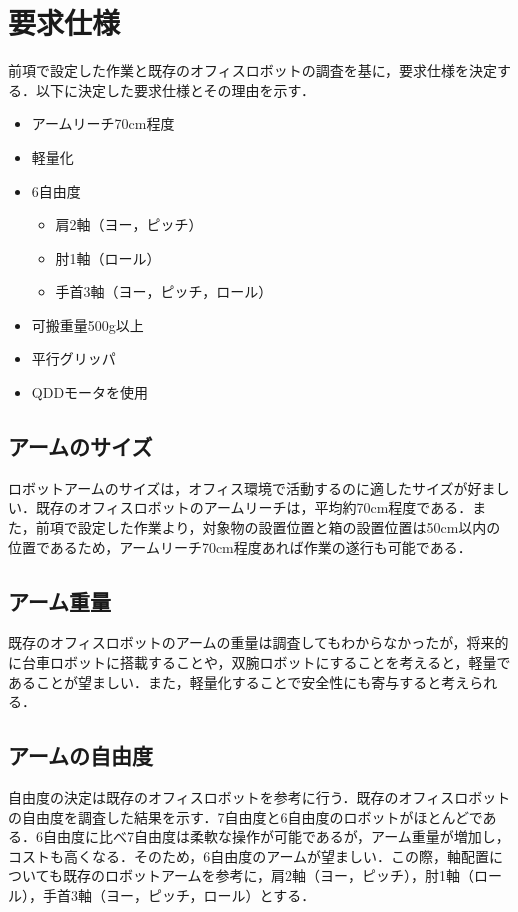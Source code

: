 \section{要求仕様}
前項で設定した作業と既存のオフィスロボットの調査を基に，要求仕様を決定する．以下に決定した要求仕様とその理由を示す．
\begin{itemize}
  \item アームリーチ70cm程度
  \item 軽量化
  \item 6自由度
  \begin{itemize}
    \item 肩2軸（ヨー，ピッチ）
    \item 肘1軸（ロール）
    \item 手首3軸（ヨー，ピッチ，ロール）
  \end{itemize}
  \item 可搬重量500g以上
  \item 平行グリッパ
  \item QDDモータを使用
\end{itemize}
\subsection{アームのサイズ}
ロボットアームのサイズは，オフィス環境で活動するのに適したサイズが好ましい．既存のオフィスロボットのアームリーチは，平均約70cm程度である．また，前項で設定した作業より，対象物の設置位置と箱の設置位置は50cm以内の位置であるため，アームリーチ70cm程度あれば作業の遂行も可能である．
\subsection{アーム重量}
既存のオフィスロボットのアームの重量は調査してもわからなかったが，将来的に台車ロボットに搭載することや，双腕ロボットにすることを考えると，軽量であることが望ましい．また，軽量化することで安全性にも寄与すると考えられる．
\subsection{アームの自由度}
自由度の決定は既存のオフィスロボットを参考に行う．既存のオフィスロボットの自由度を調査した結果を示す．7自由度と6自由度のロボットがほとんどである．6自由度に比べ7自由度は柔軟な操作が可能であるが，アーム重量が増加し，コストも高くなる．そのため，6自由度のアームが望ましい．この際，軸配置についても既存のロボットアームを参考に，肩2軸（ヨー，ピッチ），肘1軸（ロール），手首3軸（ヨー，ピッチ，ロール）とする．

